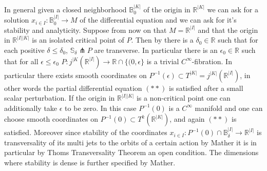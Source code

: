 \documentclass[10pt,a4paper]{amsart}
\begin{document}
In general given a closed neighborhood $\mathbb{B}_0^{|K|}$ of the origin in $\mathbb{R}^{|K|}$ we can ask for a solution $x_{i\in I}: \mathbb{B}_0^{|I|}\to M$ of the differential equation and we can ask for it's stability and analyticity. Suppose from now on that $M=\mathbb{R}^{|I|}$ and that the origin in $\mathbb{R}^{|I||K|}$ is an isolated critical point of $P$. Then by \cite{Milnor}\cite{Thom} there is a $\delta_0\in \mathbb{R}$ such that for each positive $\delta\leq \delta_0$, $\mathbb{S}_{\delta}\pitchfork P$ are transverse. In particular there is an $\epsilon_0\in \mathbb{R}$ such that for all $\epsilon\leq\epsilon_0$
$P: j^{|K}(\mathbb{R}^{|I|})\to \mathbb{R}\cap\{(0, \epsilon\}$
is a trivial $C^{\infty}$-fibration. In particular there exists smooth coordinates on $P^{-1}(\epsilon)\subset T^{|K|}=j^{|K|}(\mathbb{R}^{|I|})$, in other words the partial differential equation $(\ast \ast)$ is satisfied after a small scalar perturbation. 
If the origin in $\mathbb{R}^{|I||K|}$ is a non-critical point one can additionally take $\epsilon$ to be zero. In this case $P^{-1}(0)$ is a $C^{\infty}$ manifold and one can choose smooth coordinates on $P^{-1}(0)\subset T^k(\mathbb{R}^{|K|})$, and again $(\ast\ast)$ is satisfied. Moreover since stability of the coordinates $x_{i\in I}: P^{-1}(0)\cap \mathbb{B}_{\delta}^{|I|}\to \mathbb{R}^{|I|}$ is transversality of its multi jets to the orbits of a certain action by Mather \cite[Theorem 4.1]{Mather} it is in particular by Thoms Transversality Theorem \cite{Thom} an open condition. The dimensions where stability is dense is further specified by Mather.
\end{document}
